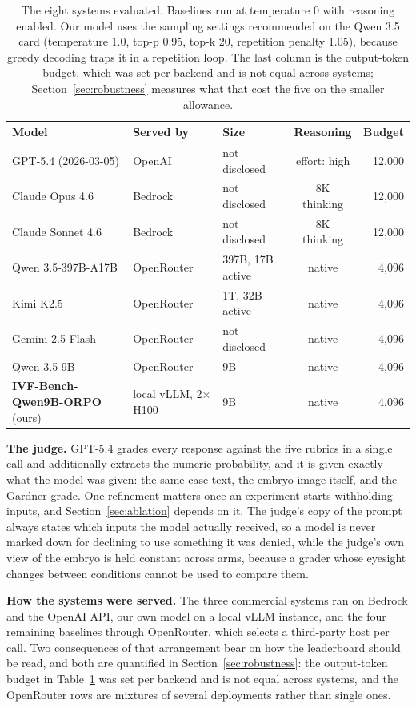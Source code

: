 \documentclass[11pt]{article}
\begin{document}
\begin{table}[H]
\centering
\small
\setlength{\tabcolsep}{4pt}
\begin{tabular}{lllcr}
\toprule
\textbf{Model} & \textbf{Served by} & \textbf{Size} & \textbf{Reasoning} & \textbf{Budget} \\
\midrule
GPT-5.4 (2026-03-05) & OpenAI & not disclosed & effort: high & 12,000 \\
Claude Opus 4.6 & Bedrock & not disclosed & 8K thinking & 12,000 \\
Claude Sonnet 4.6 & Bedrock & not disclosed & 8K thinking & 12,000 \\
Qwen 3.5-397B-A17B & OpenRouter & 397B, 17B active & native & 4,096 \\
Kimi K2.5 & OpenRouter & 1T, 32B active & native & 4,096 \\
Gemini 2.5 Flash & OpenRouter & not disclosed & native & 4,096 \\
Qwen 3.5-9B & OpenRouter & 9B & native & 4,096 \\
\midrule
\textbf{IVF-Bench-Qwen9B-ORPO} (ours) & local vLLM, 2$\times$H100 & 9B & native & 4,096 \\
\bottomrule
\end{tabular}
\caption{The eight systems evaluated. Baselines run at temperature 0 with
reasoning enabled. Our model uses the sampling settings recommended on the Qwen
3.5 card (temperature 1.0, top-p 0.95, top-k 20, repetition penalty 1.05),
because greedy decoding traps it in a repetition loop. The last column is the
output-token budget, which was set per backend and is not equal across systems;
Section~\ref{sec:robustness} measures what that cost the five on the smaller
allowance.}
\label{tab:models}
\end{table}

\textbf{The judge.} GPT-5.4 grades every response against the five rubrics in a
single call and additionally extracts the numeric probability, and it is given
exactly what the model was given: the same case text, the embryo image itself,
and the Gardner grade. One refinement matters once an experiment starts
withholding inputs, and Section~\ref{sec:ablation} depends on it. The judge's
copy of the prompt always states which inputs the model actually received, so a
model is never marked down for declining to use something it was denied, while
the judge's own view of the embryo is held constant across arms, because a grader
whose eyesight changes between conditions cannot be used to compare them.

\textbf{How the systems were served.} The three commercial systems ran on Bedrock
and the OpenAI API, our own model on a local vLLM instance, and the four
remaining baselines through OpenRouter, which selects a third-party host per
call. Two consequences of that arrangement bear on how the leaderboard should be
read, and both are quantified in Section~\ref{sec:robustness}: the output-token
budget in Table~\ref{tab:models} was set per backend and is not equal across
systems, and the OpenRouter rows are mixtures of several deployments rather than
single ones.
\end{document}
